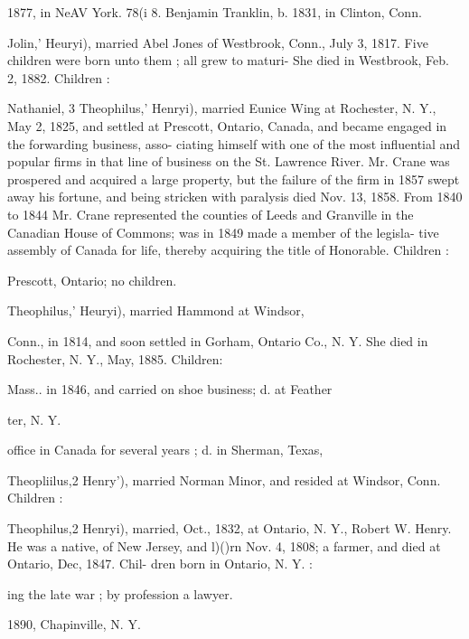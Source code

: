 \documentclass[oneside]{book}
\begin{document}
1877, in NeAV York. 
78(i 8. Benjamin Tranklin, b. 1831, in Clinton, Conn. 

Jolin,' Heuryi), married Abel Jones of Westbrook, Conn., July 
3, 1817. Five children were born unto them ; all grew to maturi- 
She died in Westbrook, Feb. 2, 1882. Children : 






Nathaniel, 3 Theophilus,' Henryi), married Eunice Wing at 
Rochester, N. Y., May 2, 1825, and settled at Prescott, Ontario, 
Canada, and became engaged in the forwarding business, asso- 
ciating himself with one of the most influential and popular firms 
in that line of business on the St. Lawrence River. Mr. Crane 
was prospered and acquired a large property, but the failure of 
the firm in 1857 swept away his fortune, and being stricken with 
paralysis died Nov. 13, 1858. From 1840 to 1844 Mr. Crane 
represented the counties of Leeds and Granville in the Canadian 
House of Commons; was in 1849 made a member of the legisla- 
tive assembly of Canada for life, thereby acquiring the title of 
Honorable. Children : 




Prescott, Ontario; no children. 









Theophilus,' Heuryi), married Hammond at Windsor, 

Conn., in 1814, and soon settled in Gorham, Ontario Co., N. Y. 
She died in Rochester, N. Y., May, 1885. Children: 


Mass.. in 1846, and carried on shoe business; d. at Feather 


ter, N. Y. 


office in Canada for several years ; d. in Sherman, Texas, 




Theopliilus,2 Henry'), married Norman Minor, and resided at 
Windsor, Conn. Children : 




Theophilus,2 Henryi), married, Oct., 1832, at Ontario, N. Y., 
Robert W. Henry. He was a native, of New Jersey, and l)()rn 
Nov. 4, 1808; a farmer, and died at Ontario, Dec, 1847. Chil- 
dren born in Ontario, N. Y. : 


ing the late war ; by profession a lawyer. 



1890, Chapinville, N. Y. 
\end{document}
